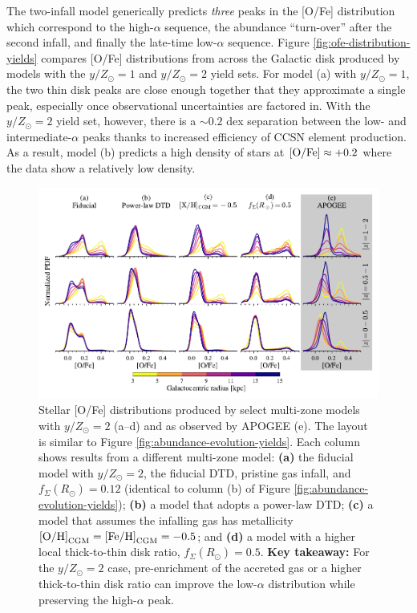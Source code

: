\documentclass[twocolumn,twocolappendix,linenumbers]{aastex631}
\newcommand{\mathOH}{{\rm [O/H]}}
\newcommand{\mathFeH}{{\rm [Fe/H]}}
\newcommand{\mathOFe}{{\rm [O/Fe]}}
\newcommand{\yZ}[1]{$y/Z_\odot=#1$}
\begin{document}
The two-infall model generically predicts {\it three} peaks in the [O/Fe] distribution which correspond to the high-$\alpha$ sequence, the abundance ``turn-over'' after the second infall, and finally the late-time low-$\alpha$ sequence. Figure \ref{fig:ofe-distribution-yields} compares [O/Fe] distributions from across the Galactic disk produced by models with the \yZ{1} and \yZ{2} yield sets. For model (a) with $y/Z_\odot=1$, the two thin disk peaks are close enough together that they approximate a single peak, especially once observational uncertainties are factored in. With the \yZ{2} yield set, however, there is a $\sim0.2$ dex separation between the low- and intermediate-$\alpha$ peaks thanks to increased efficiency of CCSN element production. As a result, model (b) predicts a high density of stars at $\mathOFe\approx+0.2$ where the data show a relatively low density.

\begin{figure}
    \centering
    \includegraphics[width=\linewidth]{src/tex/figures/ofe_distribution_params.pdf}
    \caption{Stellar [O/Fe] distributions produced by select multi-zone models with \yZ{2} (a--d) and as observed by APOGEE (e). The layout is similar to Figure \ref{fig:abundance-evolution-yields}. Each column shows results from a different multi-zone model: {\bf (a)} the fiducial model with \yZ{2}, the fiducial DTD, pristine gas infall, and $f_\Sigma(R_\odot)=0.12$ (identical to column (b) of Figure \ref{fig:abundance-evolution-yields}); {\bf (b)} a model that adopts a power-law DTD; {\bf (c)} a model that assumes the infalling gas has metallicity $\mathOH_{\rm CGM}=\mathFeH_{\rm CGM}=-0.5$; and {\bf (d)} a model with a higher local thick-to-thin disk ratio, $f_\Sigma(R_\odot)=0.5$. {\bf Key takeaway:} For the \yZ{2} case, pre-enrichment of the accreted gas or a higher thick-to-thin disk ratio can improve the low-$\alpha$ distribution while preserving the high-$\alpha$ peak.}
    \label{fig:ofe-distribution-parameters}
\end{figure}
\end{document}
